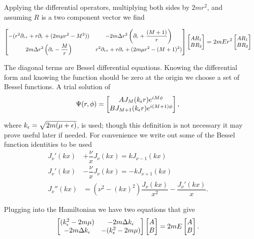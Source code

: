 Applying the differential operators, multiplying both sides by $2mr^2$, and assuming $R$ is a two component vector we find

\begin{equation*}
  \small
  \begin{bmatrix}
    -(r^2\partial_{rr} +r\partial_r +(2m\mu r^2 -M^2)) & -2m\Delta r^2\left(\partial_r + \dfrac{(M+1)}{r}\right) \\
    2m\Delta r^2\left(\partial_r - \dfrac{M}{r}\right) & r^2\partial_{rr} +r\partial_r +(2m\mu r^2 -(M+1)^2)
  \end{bmatrix} 
  \begin{bmatrix}
    AR_1 \\
    BR_2 \\
  \end{bmatrix} 
  = 2mE r^2
  \begin{bmatrix}
    AR_1 \\
    BR_2 \\
  \end{bmatrix} 
\end{equation*}

The diagonal terms are Bessel differential equations.
Knowing the differential form and knowing the function should be zero at the origin we choose a set of Bessel functions.
A trial solution of
\begin{equation}
  \Psi(r,\phi) = 
  \begin{bmatrix}
    A J_M(k_{\epsilon} r) e^{iM\phi} \\
    B J_{M+1}(k_{\epsilon} r) e^{i(M+1)\phi}
  \end{bmatrix},
\end{equation}

where $k_{\epsilon} = \sqrt{2m(\mu + \epsilon)}$, is used; though this definition is not necessary it may prove useful later if needed.
For convenience we write out some of the Bessel function identities to be used
\begin{align*}
  J_{\nu}'(kx) &+ \dfrac{\nu}{x}J_{\nu}(kx) = kJ_{\nu-1}(kx) \\
  J_{\nu}'(kx) &- \dfrac{\nu}{x}J_{\nu}(kx) = - kJ_{\nu+1}(kx) \\
  J_{\nu}''(kx) &= (\nu^2 - (kx)^2)\dfrac{J_{\nu}(kx)}{x^2} - \dfrac{J_{\nu}'(kx)}{x}.
\end{align*}

Plugging into the Hamiltonian we have two equations that give
\begin{equation*}
  \begin{bmatrix}
  (k_{\epsilon}^2-2m\mu) & -2m\Delta k_{\epsilon} \\
  -2m\Delta k_{\epsilon} & -(k_{\epsilon}^2-2m\mu)
  \end{bmatrix} 
  \begin{bmatrix}
    A \\
    B  
  \end{bmatrix}
  = 2mE
  \begin{bmatrix}
    A \\
    B  
  \end{bmatrix}.
\end{equation*}

